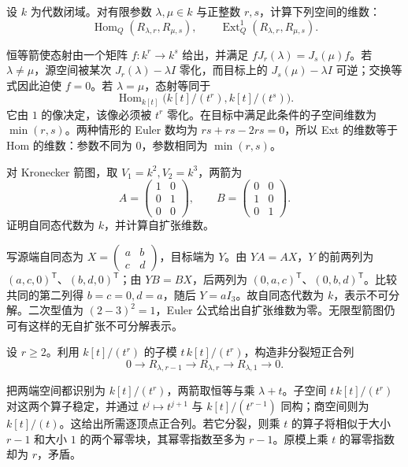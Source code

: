 \begin{optionalexercise}\label{b5:ex:10-kronecker-hom-ext}
	设 \(k\) 为代数闭域。对有限参数 \(\lambda,\mu\in k\) 与正整数 \(r,s\)，计算下列空间的维数：
	\[
		\operatorname{Hom}_Q(R_{\lambda,r},R_{\mu,s}),\qquad \operatorname{Ext}_Q^1(R_{\lambda,r},R_{\mu,s}).
	\]
\end{optionalexercise}
\begin{solution}
	恒等箭使态射由一个矩阵 \(f:k^r\to k^s\) 给出，并满足 \(fJ_r(\lambda)=J_s(\mu)f\)。若 \(\lambda\neq\mu\)，源空间被某次 \(J_r(\lambda)-\lambda I\) 零化，而目标上的 \(J_s(\mu)-\lambda I\) 可逆；交换等式因此迫使 \(f=0\)。若 \(\lambda=\mu\)，态射等同于
	\[
		\operatorname{Hom}_{k[t]}\bigl(k[t]/(t^r),k[t]/(t^s)\bigr).
	\]
	它由 \(1\) 的像决定，该像必须被 \(t^r\) 零化。在目标中满足此条件的子空间维数为 \(\min(r,s)\)。两种情形的 Euler 数均为 \(rs+rs-2rs=0\)，所以 Ext 的维数等于 Hom 的维数：参数不同为 \(0\)，参数相同为 \(\min(r,s)\)。
\end{solution}

\begin{optionalexercise}\label{b5:ex:10-kronecker-unbalanced}
	对 Kronecker 箭图，取 \(V_1=k^2,V_2=k^3\)，两箭为
	\[
		A=\begin{pmatrix}1&0\\0&1\\0&0\end{pmatrix},
		\qquad
		B=\begin{pmatrix}0&0\\1&0\\0&1\end{pmatrix}.
	\]
	证明自同态代数为 \(k\)，并计算自扩张维数。
\end{optionalexercise}
\begin{solution}
	写源端自同态为 \(X=\left(\begin{smallmatrix}a&b\\c&d\end{smallmatrix}\right)\)，目标端为 \(Y\)。由 \(YA=AX\)，\(Y\) 的前两列为 \((a,c,0)^{\mathsf T}\)、\((b,d,0)^{\mathsf T}\)；由 \(YB=BX\)，后两列为 \((0,a,c)^{\mathsf T}\)、\((0,b,d)^{\mathsf T}\)。比较共同的第二列得 \(b=c=0,d=a\)，随后 \(Y=aI_3\)。故自同态代数为 \(k\)，表示不可分解。二次型值为 \((2-3)^2=1\)，Euler 公式给出自扩张维数为零。无限型箭图仍可有这样的无自扩张不可分解表示。
\end{solution}

\begin{optionalexercise}\label{b5:ex:10-kronecker-extension}
	设 \(r\geq2\)。利用 \(k[t]/(t^r)\) 的子模 \(t\,k[t]/(t^r)\)，构造非分裂短正合列
	\[
		0\longrightarrow R_{\lambda,r-1}\longrightarrow R_{\lambda,r}\longrightarrow R_{\lambda,1}\longrightarrow0.
	\]
\end{optionalexercise}
\begin{solution}
	把两端空间都识别为 \(k[t]/(t^r)\)，两箭取恒等与乘 \(\lambda+t\)。子空间 \(t\,k[t]/(t^r)\) 对这两个算子稳定，并通过 \(t^j\mapsto t^{j+1}\) 与 \(k[t]/(t^{r-1})\) 同构；商空间则为 \(k[t]/(t)\)。这给出所需逐顶点正合列。若它分裂，则乘 \(t\) 的算子将相似于大小 \(r-1\) 和大小 \(1\) 的两个幂零块，其幂零指数至多为 \(r-1\)。原模上乘 \(t\) 的幂零指数却为 \(r\)，矛盾。
\end{solution}

